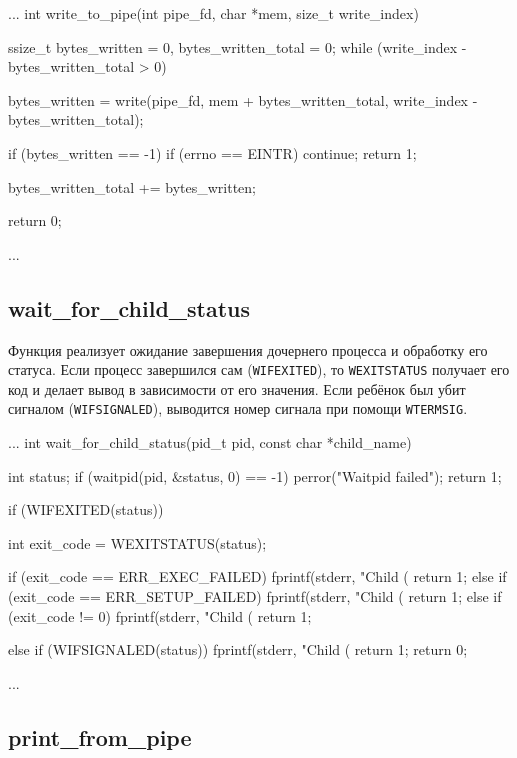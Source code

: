 \documentclass[a4paper,12pt]{article}
\begin{document}
\begin{codeblock}
...
int write_to_pipe(int pipe_fd, char *mem, size_t write_index) {
    ssize_t bytes_written = 0, bytes_written_total = 0;
    while (write_index - bytes_written_total > 0) {
        bytes_written = write(pipe_fd, mem + bytes_written_total, write_index - bytes_written_total);

        if (bytes_written == -1) {
            if (errno == EINTR) {
                continue;
            }
            return 1;
        }

        bytes_written_total += bytes_written;
    }
    return 0;
}
...
\end{codeblock}


\subsection{wait\_for\_child\_status}

Функция реализует ожидание завершения дочернего процесса и обработку его статуса. Если процесс завершился сам (\texttt{WIFEXITED}), то \texttt{WEXITSTATUS} получает его код и делает вывод в зависимости от его значения. Если ребёнок был убит сигналом (\texttt{WIFSIGNALED}), выводится номер сигнала при помощи \texttt{WTERMSIG}.

\begin{codeblock}
...
int wait_for_child_status(pid_t pid, const char *child_name) {
    int status;
    if (waitpid(pid, &status, 0) == -1) {
        perror("Waitpid failed");
        return 1;
    }

    if (WIFEXITED(status)) {
        int exit_code = WEXITSTATUS(status);

        if (exit_code == ERR_EXEC_FAILED) {
            fprintf(stderr, "Child (%
            return 1;
        } else if (exit_code == ERR_SETUP_FAILED) {
            fprintf(stderr, "Child (%
            return 1;
        } else if (exit_code != 0) {
            fprintf(stderr, "Child (%
            return 1;
        }
    } else if (WIFSIGNALED(status)) {
        fprintf(stderr, "Child (%
        return 1;
    }
    return 0;
}
...
\end{codeblock}


\subsection{print\_from\_pipe}
\end{document}
